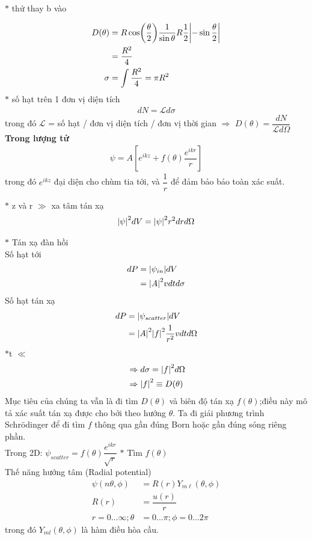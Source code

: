 \documentclass{report}
\renewcommand{\l}{\ell}
\begin{document}
\noindent$\ast$ thử thay b vào

\begin{align*}
	D(\theta) & = R \cos(\dfrac{\theta}{2}) \dfrac{1}{\sin\theta} R \dfrac{1}{2}\abs{-\sin\dfrac{\theta}{2}} \\
	          & = \dfrac{R^2}{4}                                                                             \\
	\sigma    & = \int \dfrac{R^2}{4}= \pi R^2
\end{align*}
$\ast$ số hạt trên 1 đơn vị diện tích
\begin{align*}
	dN = \mathcal{L}d\sigma
\end{align*}
trong đó $\mathcal{L}$ = số hạt / đơn vị diện tích / đơn vị thời gian $\Rightarrow$ $D(\theta) = \dfrac{dN}{\mathcal{L}d\Omega}$\\
\textbf{Trong lượng tử}
\begin{align}
	\psi = A \left[e^{ikz} + f(\theta)\dfrac{e^{ikr}}{r}\right]
\end{align}
trong đó $e^{ikz}$ đại diện cho chùm tia tới, và $\dfrac{1}{r}$ để đảm bảo bảo toàn xác suất.

$\ast$ z và r $\gg$ xa tâm tán xạ
\begin{align*}
	\abs{\psi}^2d{V} = \abs{\psi}^2r^2d {r} d\Omega
\end{align*}

$\ast$ Tán xạ đàn hồi\\
Số hạt tới
\begin{align*}
	dP & = \abs{\psi_{in}}d{V} \\
	   & = \abs{A}^2vdtd\sigma
\end{align*}
Số hạt tán xạ
\begin{align*}
	dP & = \abs{\psi_{scatter}}d{V}                   \\
	   & = \abs{A}^2\abs{f}^2\dfrac{1}{r^2}vdtd\Omega
\end{align*}
$\ast$t $\ll$
\begin{align*}
	 & \Rightarrow d\sigma = \abs{f}^2d\Omega \\
	 & \Rightarrow \abs{f}^2 \equiv D(\theta)
\end{align*}
Mục tiêu của chúng ta vẫn là đi tìm $D(\theta)$ và biên độ tán xạ $f(\theta)$;điều này mô tả xác suất tán xạ được cho bởi theo hướng $\theta$. Ta đi giải phương trình Schr\"{o}dinger để đi tìm $f$ thông qua gần đúng Born hoặc gần đúng sóng riêng phần.\\
Trong 2D: $\psi_{scatter} = f(\theta)\dfrac{e^{ik{r}}}{\sqrt{{r}}}$
\clearpage
$\ast$ Tìm $f(\theta)$\\
Thế năng hướng tâm (Radial potential)
\begin{align*}
	\psi(n\theta,\phi)      & =R({r})Y_{m\l}(\theta,\phi) \\
	R({r})                  & =\dfrac{u({r})}{{r}}        \\
	{r} =0...\infty ;\theta & = 0...\pi;\phi = 0...2\pi
\end{align*}
trong đó $Y_{ml}(\theta,\phi)$ là hàm điều hòa cầu.
\end{document}
